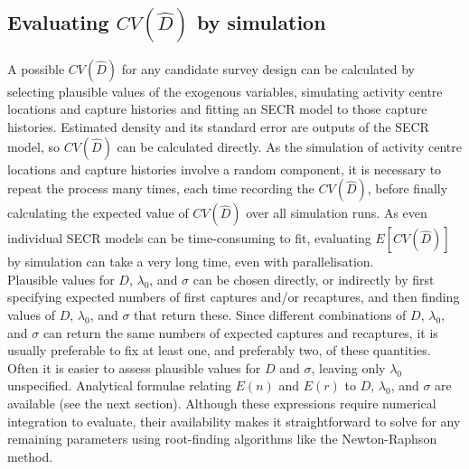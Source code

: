 \documentclass[a4paper,11pt]{article} %
\begin{document}
\subsection{Evaluating $CV(\hat{D})$ by simulation} \label{s:cvsim}

A possible $CV(\hat{D})$ for any candidate survey design can be calculated by selecting plausible values of the exogenous variables, simulating activity centre locations and capture histories and fitting an SECR model to those capture histories. Estimated density and its standard error are outputs of the SECR model, so $CV(\hat{D})$ can be calculated directly. As the simulation of activity centre locations and capture histories involve a random component, it is necessary to repeat the process many times, each time recording the $CV(\hat{D})$, before finally calculating the expected value of $CV(\hat{D})$ over all simulation runs. As even individual SECR models can be time-consuming to fit, evaluating $E[CV(\hat{D})]$ by simulation can take a very long time, even with parallelisation.
\\[1em]
Plausible values for $D$, $\lambda_0$, and $\sigma$ can be chosen directly, or indirectly by first specifying expected numbers of first captures and/or recaptures, and then finding values of $D$, $\lambda_0$, and $\sigma$ that return these. Since different combinations of $D$, $\lambda_0$, and $\sigma$ can return the same numbers of expected captures and recaptures, it is usually preferable to fix at least one, and preferably two, of these quantities. Often it is easier to assess plausible values for $D$ and $\sigma$, leaving only $\lambda_0$ unspecified. Analytical formulae relating $E(n)$ and $E(r)$ to $D$, $\lambda_0$, and $\sigma$ are available (see the next section). Although these expressions require numerical integration to evaluate, their availability makes it straightforward to solve for any remaining parameters using root-finding algorithms like the Newton-Raphson method.
\\[1em]
\end{document}
